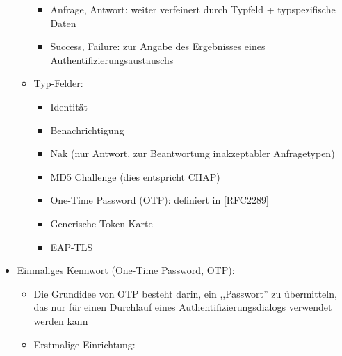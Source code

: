 \documentclass[a4paper]{article}
\begin{document}
\begin{multicols}{3}
\begin{itemize}
\begin{itemize}
                        \begin{itemize}
                            \item
                                  Anfrage, Antwort: weiter verfeinert durch Typfeld + typspezifische
                                  Daten
                            \item
                                  Success, Failure: zur Angabe des Ergebnisses eines
                                  Authentifizierungsaustauschs
                        \end{itemize}
                  \item
                        Typ-Felder:

                        \begin{itemize}
                            \item
                                  Identität
                            \item
                                  Benachrichtigung
                            \item
                                  Nak (nur Antwort, zur Beantwortung inakzeptabler Anfragetypen)
                            \item
                                  MD5 Challenge (dies entspricht CHAP)
                            \item
                                  One-Time Password (OTP): definiert in {[}RFC2289{]}
                            \item
                                  Generische Token-Karte
                            \item
                                  EAP-TLS
                        \end{itemize}
              \end{itemize}
        \item
              Einmaliges Kennwort (One-Time Password, OTP):

              \begin{itemize}
                  \item
                        Die Grundidee von OTP besteht darin, ein ,,Passwort'' zu
                        übermitteln, das nur für einen Durchlauf eines
                        Authentifizierungsdialogs verwendet werden kann
                  \item
                        Erstmalige Einrichtung:


\end{itemize}
\end{itemize}
\end{multicols}
\end{document}
